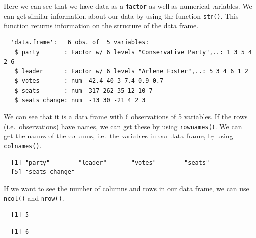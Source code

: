 \documentclass[12pt,oneside]{reedthesis}
\theoremstyle{definition}
\theoremstyle{definition}
\theoremstyle{definition}
\theoremstyle{remark}
\begin{document}
  Here we can see that we have data as a \texttt{factor} as well as
  numerical variables. We can get similar information about our data by
  using the function \texttt{str()}. This function returns information on
  the structure of the data frame.
  \begin{Shaded}
  \begin{Highlighting}[]
  \end{Highlighting}
  \end{Shaded}
  \begin{verbatim}
  'data.frame':   6 obs. of  5 variables:
   $ party       : Factor w/ 6 levels "Conservative Party",..: 1 3 5 4 2 6
   $ leader      : Factor w/ 6 levels "Arlene Foster",..: 5 3 4 6 1 2
   $ votes       : num  42.4 40 3 7.4 0.9 0.7
   $ seats       : num  317 262 35 12 10 7
   $ seats_change: num  -13 30 -21 4 2 3
  \end{verbatim}
  We can see that it is a data frame with 6 observations of 5 variables.
  If the rows (i.e.~observations) have names, we can get these by using
  \texttt{rownames()}. We can get the names of the columns, i.e.~the
  variables in our data frame, by using \texttt{colnames()}.
  \begin{Shaded}
  \begin{Highlighting}[]
  \end{Highlighting}
  \end{Shaded}
  \begin{verbatim}
  [1] "party"        "leader"       "votes"        "seats"       
  [5] "seats_change"
  \end{verbatim}
  If we want to see the number of columns and rows in our data frame, we
  can use \texttt{ncol()} and \texttt{nrow()}.
  \begin{Shaded}
  \begin{Highlighting}[]
  \end{Highlighting}
  \end{Shaded}
  \begin{verbatim}
  [1] 5
  \end{verbatim}
  \begin{Shaded}
  \begin{Highlighting}[]
  \end{Highlighting}
  \end{Shaded}
  \begin{verbatim}
  [1] 6
  \end{verbatim}
\end{document}
